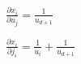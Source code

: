 \documentclass[paper=a4, fontsize=11pt]{scrartcl}
\begin{document}
	$\frac{\partial x_i}{\partial u_j} = \frac{1}{u_{d+1}}$
	
	$\frac{\partial x_i}{\partial j_i} = \frac{1}{u_i} + \frac{1}{u_{d+1}}$
\end{document}
